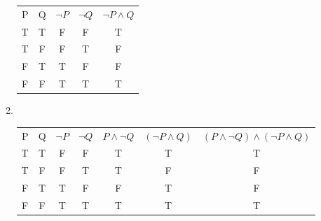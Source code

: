 \documentclass[12pt]{exam}
\begin{document}
\begin{enumerate}
\begin{enumerate}
\begin{table}[h]
                    \begin{tabular}{ccccc}
                        
                        P & Q & $ \lnot P $ & $ \lnot Q $ & $ \lnot P \land Q $  \\
                        
                        T       & T       & F       & F       & T       \\
                        T       & F       & F       & T       & F       \\
                        F       & T       & T       & F       & F       \\
                        F       & F       & T       & T       & T       \\
                        
                        
                    \end{tabular}
                \end{table}   
                            
            \item ~\\
             
                \begin{table}[h]
                    \centering 
                    \label{tab:example_table}
                    
                    \begin{tabular}{ccccccc}
                        
                        P & Q & $ \lnot P $ & $ \lnot Q $ & $ P \land \lnot Q $ & $ ( \lnot P \land Q ) $ & $ ( P \land \lnot Q ) \land ( \lnot P \land Q )$ \\
                        
                        T       & T       & F       & F       & T       & T       & T       \\
                        T       & F       & F       & T       & T       & F       & F       \\
                        F       & T       & T       & F       & F       & T       & F       \\
                        F       & F       & T       & T       & T       & T       & T       \\
                        
                        
                    \end{tabular}
                \end{table}   
                           

\end{enumerate}
\end{enumerate}
\end{document}
